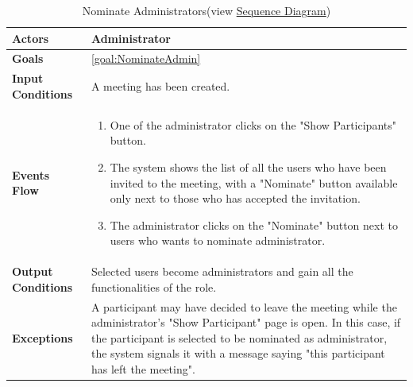 \begin{table}[H]
	\centering
	\def\arraystretch{1.5}
	\begin{tabular}{|m{7cm}|m{7cm}|}
		\hline
		\textbf{Actors}            & Administrator    \\ \hline
		\textbf{Goals}             & \ref{goal:NominateAdmin}           \\ \hline
		\textbf{Input Conditions}  & A meeting has been created.           \\ \hline
		\textbf{Events Flow}       &  
		\begin{enumerate}[topsep=0pt, leftmargin=*]
			\item One of the administrator clicks on the "Show Participants" button.
			\item The system shows the list of all the users who have been invited to the meeting, with a "Nominate" button available only next to those who has accepted the invitation.
			\item The administrator clicks on the "Nominate" button next to users who wants to nominate administrator.
		\end{enumerate}             \\ \hline
		\textbf{Output Conditions} & Selected users become administrators and gain all the functionalities of the role.           \\ \hline
		\textbf{Exceptions}        & A participant may have decided to leave the meeting while the administrator's "Show Participant" page is open. In this case, if the participant is selected to be nominated as administrator, the system signals it with a message saying "this participant has left the meeting".      \\ \hline
	\end{tabular}
	\caption[Nominate Administrators]{{Nominate Administrators}\label{UseCaseDescr:NominateAdmin} (view \hyperref[SeqDiagr:NominateAdmin]{Sequence Diagram})}
\end{table}


